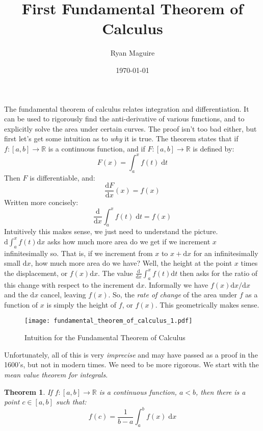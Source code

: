 \documentclass{article}
\title{First Fundamental Theorem of Calculus}
\author{Ryan Maguire}
\date{\today}
\theoremstyle{plain}
\newtheorem{theorem}{Theorem}
\begin{document}
    \maketitle
    The fundamental theorem of calculus relates integration and differentiation.
    It can be used to rigorously find the anti-derivative of various functions,
    and to explicitly solve the area under certain curves. The proof isn't too
    bad either, but first let's get some intuition as to \textit{why} it is
    true. The theorem states that if $f:[a,b]\rightarrow\mathbb{R}$ is a
    continuous function, and if $F:[a,b]\rightarrow\mathbb{R}$ is defined by:
    \begin{equation}
        F(x)=\int_{a}^{x}f(t)\;\textrm{d}t
    \end{equation}
    Then $F$ is differentiable, and:
    \begin{equation}
        \frac{\textrm{d}F}{\textrm{d}x}(x)=f(x)
    \end{equation}
    Written more concisely:
    \begin{equation}
        \frac{\textrm{d}}{\textrm{d}x}\int_{a}^{x}f(t)\;\textrm{d}t=f(x)
    \end{equation}
    Intuitively this makes sense, we just need to understand the picture.
    $\textrm{d}\int_{a}^{x}f(t)\textrm{d}x$ asks how much more
    area do we get if we increment $x$ infinitesimally so. That is, if we
    increment from $x$ to $x+\textrm{d}x$ for an infinitesimally small
    $\textrm{d}x$, how much more area do we have? Well, the height at the point
    $x$ times the displacement, or $f(x)\textrm{d}x$. The value
    $\frac{\textrm{d}}{\textrm{d}x}\int_{a}^{x}f(t)\textrm{d}t$ then asks for
    the ratio of this change with respect to the increment $\textrm{d}x$.
    Informally we have $f(x)\textrm{d}x/\textrm{d}x$ and the $\textrm{d}x$
    cancel, leaving $f(x)$. So, the \textit{rate of change} of the area under
    $f$ as a function of $x$ is simply the height of $f$, or $f(x)$. This
    geometrically makes sense.
    \begin{figure}
        \centering
        \texttt{[image: fundamental\_theorem\_of\_calculus\_1.pdf]}
        \caption{Intuition for the Fundamental Theorem of Calculus}
    \end{figure}
    Unfortunately, all of this is very
    \textit{imprecise} and may have passed as a proof in the 1600's, but not
    in modern times. We need to be more rigorous. We start with the
    \textit{mean value theorem for integrals}.
    \begin{theorem}
        If $f:[a,b]\rightarrow\mathbb{R}$ is a continuous function, $a<b$,
        then there is a point $c\in[a,b]$ such that:
        \begin{equation}
            f(c)=\frac{1}{b-a}\int_{a}^{b}f(x)\;\textrm{d}x
        \end{equation}
    \end{theorem}
\end{document}
